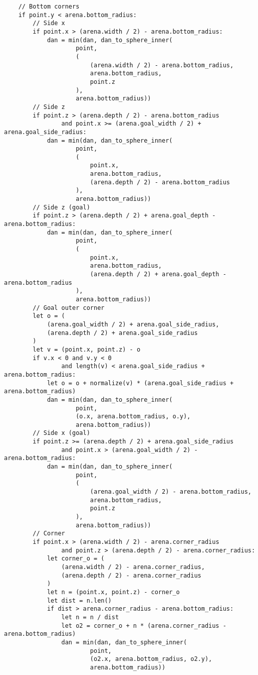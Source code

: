 \begin{verbatim}
    // Bottom corners
    if point.y < arena.bottom_radius:
        // Side x
        if point.x > (arena.width / 2) - arena.bottom_radius:
            dan = min(dan, dan_to_sphere_inner(
                    point,
                    (
                        (arena.width / 2) - arena.bottom_radius,
                        arena.bottom_radius,
                        point.z
                    ),
                    arena.bottom_radius))
        // Side z
        if point.z > (arena.depth / 2) - arena.bottom_radius
                and point.x >= (arena.goal_width / 2) + arena.goal_side_radius:
            dan = min(dan, dan_to_sphere_inner(
                    point,
                    (
                        point.x,
                        arena.bottom_radius,
                        (arena.depth / 2) - arena.bottom_radius
                    ),
                    arena.bottom_radius))
        // Side z (goal)
        if point.z > (arena.depth / 2) + arena.goal_depth - arena.bottom_radius:
            dan = min(dan, dan_to_sphere_inner(
                    point,
                    (
                        point.x,
                        arena.bottom_radius,
                        (arena.depth / 2) + arena.goal_depth - arena.bottom_radius
                    ),
                    arena.bottom_radius))
        // Goal outer corner
        let o = (
            (arena.goal_width / 2) + arena.goal_side_radius,
            (arena.depth / 2) + arena.goal_side_radius
        )
        let v = (point.x, point.z) - o
        if v.x < 0 and v.y < 0
                and length(v) < arena.goal_side_radius + arena.bottom_radius:
            let o = o + normalize(v) * (arena.goal_side_radius + arena.bottom_radius)
            dan = min(dan, dan_to_sphere_inner(
                    point,
                    (o.x, arena.bottom_radius, o.y),
                    arena.bottom_radius))
        // Side x (goal)
        if point.z >= (arena.depth / 2) + arena.goal_side_radius
                and point.x > (arena.goal_width / 2) - arena.bottom_radius:
            dan = min(dan, dan_to_sphere_inner(
                    point,
                    (
                        (arena.goal_width / 2) - arena.bottom_radius,
                        arena.bottom_radius,
                        point.z
                    ),
                    arena.bottom_radius))
        // Corner
        if point.x > (arena.width / 2) - arena.corner_radius
                and point.z > (arena.depth / 2) - arena.corner_radius:
            let corner_o = (
                (arena.width / 2) - arena.corner_radius,
                (arena.depth / 2) - arena.corner_radius
            )
            let n = (point.x, point.z) - corner_o
            let dist = n.len()
            if dist > arena.corner_radius - arena.bottom_radius:
                let n = n / dist
                let o2 = corner_o + n * (arena.corner_radius - arena.bottom_radius)
                dan = min(dan, dan_to_sphere_inner(
                        point,
                        (o2.x, arena.bottom_radius, o2.y),
                        arena.bottom_radius))


\end{verbatim}
